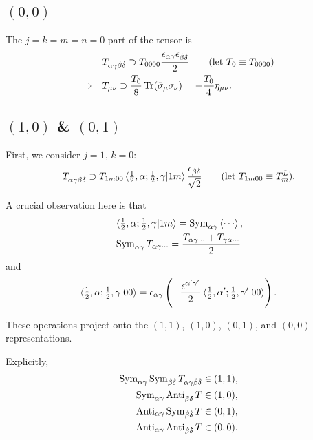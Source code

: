 \subsection{\texorpdfstring{$(0, 0)$}{(0,0)}}
The $j = k = m = n = 0$ part of the tensor is
\begin{align}
    & T_{\alpha \gamma \dot\beta \dot\delta} \supset T_{0 0 0 0} \frac{\epsilon_{\alpha \gamma} \epsilon_{\dot\beta \dot\delta}}{2} \qquad (\text{let }T_0 \equiv T_{0 0 0 0}) \\
    \Rightarrow \quad & T_{\mu \nu} \supset \frac{T_0}{8} \operatorname{Tr}(\bar\sigma_\mu \sigma_\nu) = - \frac{T_0}{4} \eta_{\mu \nu}.
\end{align}
\subsection{\texorpdfstring{$(1, 0)$ \& $(0, 1)$}{(1,0) and (0,1)}}
First, we consider $j = 1$, $k = 0$:
\begin{equation}
    T_{\alpha \gamma \dot\beta \dot\delta} \supset T_{1 m 0 0} \braket{\tfrac{1}{2}, \alpha; \tfrac{1}{2}, \gamma | 1 m} \frac{\epsilon_{\dot\beta \dot\delta}}{\sqrt{2}} \qquad (\text{let }T_{1 m 0 0} \equiv T_m^L).
\end{equation}
\begin{framed}
    A crucial observation here is that
    \begin{align}
        & \braket{\tfrac{1}{2}, \alpha; \tfrac{1}{2}, \gamma | 1 m} = \operatorname{Sym}_{\alpha \gamma} \braket{\cdots}, \\
        & \operatorname{Sym}_{\alpha \gamma} T_{\alpha \gamma \cdots} = \frac{T_{\alpha \gamma \cdots} + T_{\gamma \alpha \cdots}}{2}
    \end{align}
    and
    \begin{equation}
        \braket{\tfrac{1}{2}, \alpha; \tfrac{1}{2}, \gamma | 0 0} = \epsilon_{\alpha \gamma} \left( - \frac{\epsilon^{\alpha' \gamma'}}{2} \braket{\tfrac{1}{2}, \alpha'; \tfrac{1}{2}, \gamma' | 0 0} \right).
    \end{equation}
\end{framed}
These operations project onto the $(1, 1)$, $(1, 0)$, $(0, 1)$, and $(0, 0)$ representations.

Explicitly,
\begin{align}
    \operatorname{Sym}_{\alpha \gamma} \operatorname{Sym}_{\dot\beta \dot\delta} T_{\alpha \gamma \dot\beta \dot\delta} & \in (1, 1), \notag \\
    \operatorname{Sym}_{\alpha \gamma} \operatorname{Anti}_{\dot\beta \dot\delta} T & \in (1, 0), \notag \\
    \operatorname{Anti}_{\alpha \gamma} \operatorname{Sym}_{\dot\beta \dot\delta} T & \in (0, 1), \notag \\
    \operatorname{Anti}_{\alpha \gamma} \operatorname{Anti}_{\dot\beta \dot\delta} T & \in (0, 0).
\end{align}
